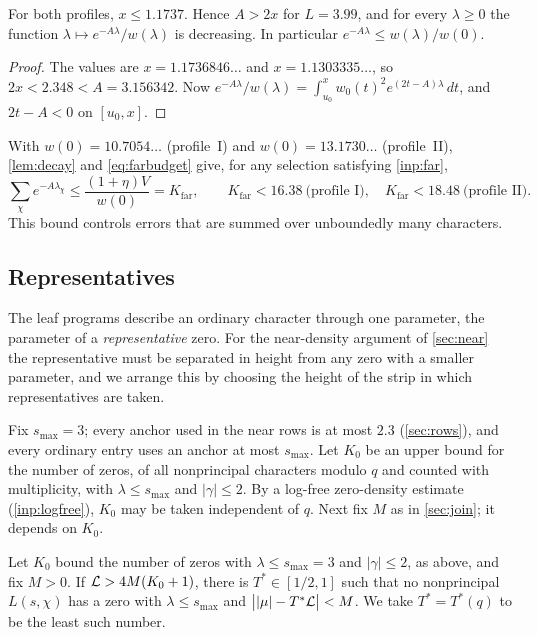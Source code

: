 \begin{lemma}\label{lem:decay}
For both profiles, $x\le1.1737$. Hence $A>2x$ for $L=3.99$, and for every $\lambda\ge0$ the function
$\lambda\mapsto e^{-A\lambda}/w(\lambda)$ is decreasing. In particular
$e^{-A\lambda}\le w(\lambda)/w(0)$.
\end{lemma}

\begin{proof}
The values are $x=1.1736846\ldots$ and $x=1.1303335\ldots$, so $2x<2.348<A=3.156342$. Now
$e^{-A\lambda}/w(\lambda)=\int_{u_0}^xw_0(t)^2e^{(2t-A)\lambda}\,dt$, and $2t-A<0$ on
$[u_0,x]$.
\end{proof}

With $w(0)=10.7054\ldots$ (profile~I) and $w(0)=13.1730\ldots$ (profile~II), \cref{lem:decay} and
\eqref{eq:farbudget} give, for any selection satisfying \cref{inp:far},
\begin{equation}\label{eq:Kfar}
  \sum_\chi e^{-A\lambda_\chi}\le\frac{(1+\eta)V}{w(0)}=K_{\mathrm{far}},\qquad
  K_{\mathrm{far}}<16.38\ \text{(profile I)},\quad K_{\mathrm{far}}<18.48\ \text{(profile II)}.
\end{equation}
This bound controls errors that are summed over unboundedly many characters.

\subsection{Representatives}\label{subsec:representatives}
The leaf programs describe an ordinary character through one parameter, the parameter of a
\emph{representative} zero. For the near-density argument of \cref{sec:near} the representative
must be separated in height from any zero with a smaller parameter, and we arrange this by
choosing the height of the strip in which representatives are taken.

Fix $s_{\max}=3$; every anchor used in the near rows is at most $2.3$ (\cref{sec:rows}), and every
ordinary entry uses an anchor at most $s_{\max}$. Let $K_0$ be an upper bound for
the number of zeros, of all nonprincipal characters modulo $q$ and counted with multiplicity,
with $\lambda\le s_{\max}$ and $|\gamma|\le2$. By a log-free zero-density estimate
(\cref{inp:logfree}), $K_0$ may be taken independent of $q$. Next fix $M$ as in \cref{sec:join};
it depends on $K_0$.

\begin{lemma}\label{lem:Tstar}
Let $K_0$ bound the number of zeros with $\lambda\le s_{\max}=3$ and $|\gamma|\le2$,
as above, and fix $M>0$. If $\mathcal{L}>4M(K_0+1)$, there is $T^*\in[1/2,1]$ such that no nonprincipal $L(s,\chi)$ has a zero with
$\lambda\le s_{\max}$ and $\bigl||\mu|-T^*\mathcal{L}\bigr|<M$. We take $T^*=T^*(q)$ to be the least such number.
\end{lemma}

